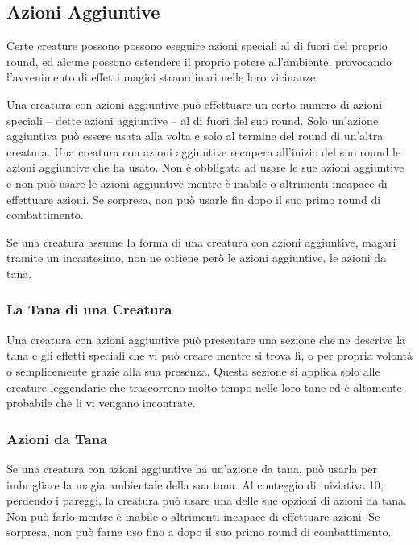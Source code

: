 \begin{multicols}{2}
\subsection{Azioni Aggiuntive}

Certe creature possono possono eseguire azioni speciali al di fuori del proprio round, ed alcune possono estendere il proprio potere all'ambiente, provocando l'avvenimento di effetti magici straordinari nelle loro vicinanze.

Una creatura con azioni aggiuntive può effettuare un certo numero di azioni speciali -- dette azioni aggiuntive -- al di fuori del suo round. Solo un'azione aggiuntiva può essere usata alla volta e solo al termine del round di un'altra creatura. Una creatura con azioni aggiuntive recupera all'inizio del suo round le azioni aggiuntive che ha usato. Non è obbligata ad usare le sue azioni aggiuntive e non può usare le azioni aggiuntive mentre è inabile o altrimenti incapace di effettuare azioni. Se sorpresa, non può usarle fin dopo il suo primo round di combattimento.

Se una creatura assume la forma di una creatura con azioni aggiuntive, magari tramite un incantesimo, non ne ottiene però le azioni aggiuntive, le azioni da tana.

\subsubsection{La Tana di una Creatura}

Una creatura con azioni aggiuntive può presentare una sezione che ne descrive la tana e gli effetti speciali che vi può creare mentre si trova lì, o per propria volontà o semplicemente grazie alla sua presenza. Questa sezione si applica solo alle creature leggendarie che trascorrono molto tempo nelle loro tane ed è altamente probabile che li vi vengano incontrate.

\subsubsection{Azioni da Tana}

Se una creatura con azioni aggiuntive ha un'azione da tana, può usarla per imbrigliare la magia ambientale della sua tana. Al conteggio di iniziativa 10, perdendo i pareggi, la creatura può usare una delle sue opzioni di azioni da tana. Non può farlo mentre è inabile o altrimenti incapace di effettuare azioni. Se sorpresa, non può farne uso fino a dopo il suo primo round di combattimento.


\end{multicols}
